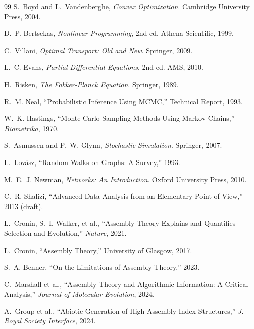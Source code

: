 \documentclass[12pt, oneside]{article}
\theoremstyle{plain}
\theoremstyle{definition}
\theoremstyle{remark}
\begin{document}
\begin{thebibliography}{99}
S.~Boyd and L.~Vandenberghe,
\textit{Convex Optimization}.
Cambridge University Press, 2004.

D.~P. Bertsekas,
\textit{Nonlinear Programming}, 2nd ed.
Athena Scientific, 1999.

C.~Villani,
\textit{Optimal Transport: Old and New}.
Springer, 2009.

L.~C. Evans,
\textit{Partial Differential Equations}, 2nd ed.
AMS, 2010.

H.~Risken,
\textit{The Fokker-Planck Equation}.
Springer, 1989.

R.~M. Neal,
``Probabilistic Inference Using MCMC,''
Technical Report, 1993.

W.~K. Hastings,
``Monte Carlo Sampling Methods Using Markov Chains,''
\textit{Biometrika}, 1970.

S.~Asmussen and P.~W. Glynn,
\textit{Stochastic Simulation}.
Springer, 2007.

L.~Lov\'asz,
``Random Walks on Graphs: A Survey,''
1993.

M.~E.~J. Newman,
\textit{Networks: An Introduction}.
Oxford University Press, 2010.

C.~R. Shalizi,
``Advanced Data Analysis from an Elementary Point of View,''
2013 (draft).

L.~Cronin, S.~I. Walker, et al.,
``Assembly Theory Explains and Quantifies Selection and Evolution,''
\textit{Nature}, 2021.

L.~Cronin,
``Assembly Theory,''
University of Glasgow, 2017.

S.~A. Benner,
``On the Limitations of Assembly Theory,''
2023.

C.~Marshall et al.,
``Assembly Theory and Algorithmic Information: A Critical Analysis,''
\textit{Journal of Molecular Evolution}, 2024.

A.~Group et al.,
``Abiotic Generation of High Assembly Index Structures,''
\textit{J. Royal Society Interface}, 2024.

\end{thebibliography}
\end{document}
